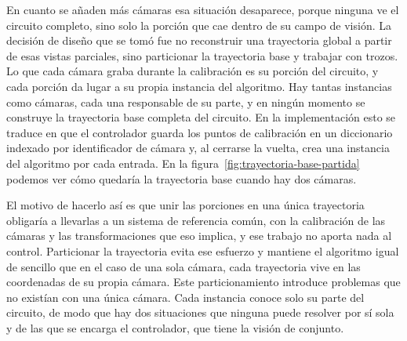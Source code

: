 En cuanto se añaden más cámaras esa situación desaparece, porque ninguna ve el circuito completo, sino solo la porción que cae dentro de su campo de visión. La decisión de diseño que se tomó fue no reconstruir una trayectoria global a partir de esas vistas parciales, sino particionar la trayectoria base y trabajar con trozos. Lo que cada cámara graba durante la calibración es su porción del circuito, y cada porción da lugar a su propia instancia del algoritmo. Hay tantas instancias como cámaras, cada una responsable de su parte, y en ningún momento se construye la trayectoria base completa del circuito. En la implementación esto se traduce en que el controlador guarda los puntos de calibración en un diccionario indexado por identificador de cámara y, al cerrarse la vuelta, crea una instancia del algoritmo por cada entrada. 
En la figura~\ref{fig:trayectoria-base-partida} podemos ver cómo quedaría la trayectoria base cuando hay dos cámaras. %

El motivo de hacerlo así es que unir las porciones en una única trayectoria obligaría a llevarlas a un sistema de referencia común, con la calibración de las cámaras y las transformaciones que eso implica, y ese trabajo no aporta nada al control. Particionar la trayectoria evita ese esfuerzo y mantiene el algoritmo igual de sencillo que en el caso de una sola cámara, cada trayectoria vive en las coordenadas de su propia cámara. 
Este particionamiento introduce problemas que no existían con una única cámara. Cada instancia conoce solo su parte del circuito, de modo que hay dos situaciones que ninguna puede resolver por sí sola y de las que se encarga el controlador, que tiene la visión de conjunto.

